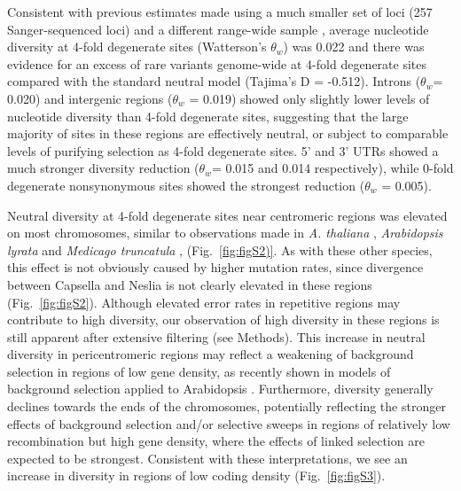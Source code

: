 Consistent with previous estimates made using a much smaller set of loci (257 Sanger-sequenced loci) and a different range-wide sample \citep{Slotte2010-gw}, average nucleotide diversity at 4-fold degenerate sites (Watterson’s $\theta_{w}$) was 0.022 and there was evidence for an excess of rare variants genome-wide at 4-fold degenerate sites compared with the standard neutral model (Tajima’s D = -0.512). Introns ($\theta_{w}$= 0.020) and intergenic regions ($\theta_{w}$ = 0.019) showed only slightly lower levels of nucleotide diversity than 4-fold degenerate sites, suggesting that the large majority of sites in these regions are effectively neutral, or subject to comparable levels of purifying selection as 4-fold degenerate sites. 5’ and 3’ UTRs showed a much stronger diversity reduction ($\theta_{w}$= 0.015 and 0.014 respectively), while 0-fold degenerate nonsynonymous sites showed the strongest reduction ($\theta_{w}$ = 0.005).

Neutral diversity at 4-fold degenerate sites near centromeric regions was elevated on most chromosomes, similar to observations made in \textit{A. thaliana} \citep{clark2007}, \textit{Arabidopsis lyrata} \citep{wright2006,kawabe2008} and \textit{Medicago truncatula} \citep{branca2011}, (Fig.~\ref{fig:figS2)}. As with these other species, this effect is not obviously caused by higher mutation rates, since divergence between Capsella and Neslia is not clearly elevated in these regions (Fig.~\ref{fig:figS2}). Although elevated error rates in repetitive regions may contribute to high diversity, our observation of high diversity in these regions is still apparent after extensive filtering (see Methods). This increase in neutral diversity in pericentromeric regions may reflect a weakening of background selection in regions of low gene density, as recently shown in models of background selection applied to Arabidopsis \citep{slotte2014impact}.  Furthermore, diversity generally declines towards the ends of the chromosomes, potentially reflecting the stronger effects of background selection and/or selective sweeps in regions of relatively low recombination but high gene density, where the effects of linked selection are expected to be strongest. Consistent with these interpretations, we see an increase in diversity in regions of low coding density (Fig.~\ref{fig:figS3}).

